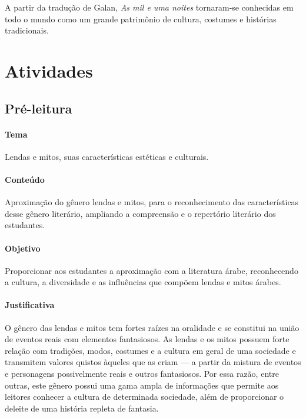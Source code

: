 \documentclass[11pt]{extarticle}
\begin{document}
A partir da tradução de Galan, \textit{As mil e uma noites} tornaram-se conhecidas em todo o mundo como um grande patrimônio de cultura, costumes e histórias tradicionais.


\section{Atividades}

\subsection{Pré-leitura}

\paragraph{Tema} Lendas e mitos, suas características estéticas e culturais.

\paragraph{Conteúdo} Aproximação do gênero lendas e mitos, para o reconhecimento das características desse gênero literário, ampliando a compreensão e o repertório literário dos estudantes.

\paragraph{Objetivo} Proporcionar aos estudantes a aproximação com a literatura árabe, reconhecendo a cultura, a diversidade e as influências que compõem lendas e mitos árabes.

\paragraph{Justificativa} O gênero das lendas e mitos tem fortes raízes na oralidade e se constitui na união de eventos reais com elementos fantasiosos. As lendas e os mitos possuem forte relação com tradições, modos, costumes e a cultura em geral de uma sociedade e transmitem valores quistos àqueles que as criam --- a partir da mistura de eventos e personagens possivelmente reais e outros fantasiosos. Por essa razão, entre outras, este gênero possui uma gama ampla de informações que permite aos leitores conhecer a cultura de determinada sociedade, além de proporcionar o deleite de uma história repleta de fantasia. 
\end{document}
